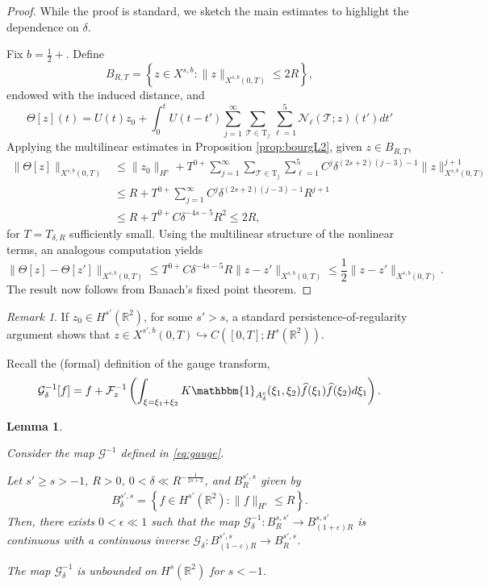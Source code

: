 \documentclass[a4paper,
11pt,  reqno]{amsart}
\newcommand{\5}{\textup{V}}
\newcommand{\noi}{\noindent}
\newcommand{\dl}{\delta}
\newcommand{\F}{\mathcal{F}}
\newcommand{\eps}{\varepsilon}
\newtheorem{lemma}[theorem]{Lemma}
\theoremstyle{remark}
\newtheorem{remark}[theorem]{Remark}
\newcommand{\R}{\mathbb{R}}
\newcommand{\TT}{\mathcal{T}}
\newcommand{\Tr}{\mathrm{T}}
\renewcommand{\l}{\ell}
\newcommand{\Gc}{\mathcal{G}}
\numberwithin{equation}{section}
\numberwithin{theorem}{section}
\newcommand{\Ncal}{\mathcal{N}}
\begin{document}
\begin{proof}
While the proof is standard, we sketch the main estimates to highlight the dependence on $\delta$.

Fix $b=\frac12+$. Define 
$$
B_{R,T}=\left\{ z\in X^{s,b} : \|z\|_{X^{s,b}(0,T)}\le 2R \right\},
$$
endowed with the induced distance, and
$$
\Theta[z](t)=U(t)z_0 + \int_0^t U(t-t')\sum_{j=1}^\infty \sum_{\TT \in \Tr_j} \sum_{\l=1}^5  \Ncal_\l(\TT;z)(t')dt'
$$
Applying the multilinear estimates in Proposition \ref{prop:bourgL2}, given $z\in B_{R,T}$,
\begin{align}
\|\Theta[z]\|_{X^{s,b}(0,T)} &\le \|z_0\|_{H^s} + T^{0+}\sum_{j=1}^\infty \sum_{\TT \in \Tr_j} \sum_{\l=1}^5 C^j\delta^{(2s+2)(j-3)-1}\|z\|_{X^{s,b}(0,T)}^{j+1} \\&\le R + T^{0+}\sum_{j=1}^\infty C^j\delta^{(2s+2)(j-3)-1}R^{j+1} \\&\le R+T^{0+}C\delta^{-4s-5}R^2 \le 2R,
\end{align}
for $T=T_{\delta,R}$ sufficiently small. Using the multilinear structure of the nonlinear terms, an analogous computation yields
$$
\|\Theta[z]-\Theta[z']\|_{X^{s,b}(0,T)} \le T^{0+}C\delta^{-4s-5}R\|z-z'\|_{X^{s,b}(0,T)} \le \frac12\|z-z'\|_{X^{s,b}(0,T)}.
$$
The result now follows from Banach's fixed point theorem.
\end{proof}

\begin{remark}\label{remark:persistence}
If $z_0\in H^{s'}(\R^2)$, for some $s'>s$, a standard persistence-of-regularity argument shows that $z\in X^{s',b}(0,T) \hookrightarrow C([0,T]; H^s(\R^2))$.
\end{remark}


Recall the (formal) definition of the gauge transform,
\begin{equation}\label{eq:gauge}
\mathcal{G}_\delta^{-1}[f]=f+\F_{z}^{-1}\left(\int_{\xi=\xi_1+\xi_2} K\mathbbm{1}_{A^c_\delta}(\xi_1,\xi_2)\widehat{f}(\xi_1)\widehat{f}(\xi_2)d\xi_1\right).
\end{equation}



\begin{lemma}\label{LEM:D}

Consider the map  $\Gc^{-1}$ defined in \eqref{eq:gauge}.

\smallskip



\noi {\rm(i)}
Let $s' \ge s>-1$, $R>0$, $0<\dl \ll R^{-\frac{1}{2s+2}}$, and $B_{R}^{s',s}$ given by
\begin{align}
\label{Bss}
B^{s',s}_\delta=\left\{ f\in H^{s'}(\R^2): \|f\|_{H^s} \le R \right\}.
\end{align}
Then, there exists $0<\epsilon\ll 1$ such that the map $\Gc_\dl^{-1}: B^{s, s'}_R \to B^{s,s'}_{(1+\eps)R}$ is continuous with a continuous inverse $\Gc_\dl: B^{s',s}_{(1-\eps)R} \to B^{s',s}_R$.

\smallskip
\noi {\rm(ii)} The map $\Gc_\dl^{-1}$ is unbounded on $H^s(\R^2)$ for $s< - 1$.


\end{lemma}
\end{document}
